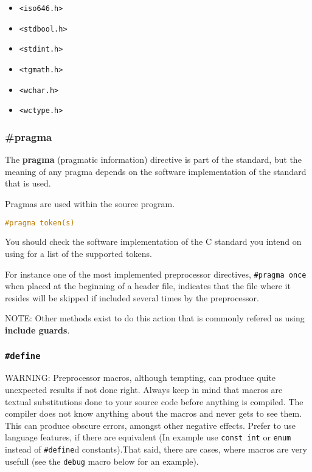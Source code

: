 \begin{itemize}
\setlength{\itemsep}{0cm}
\setlength{\parskip}{0cm}
	\item \texttt{\textless{}iso646.h\textgreater{}}
	\item \texttt{\textless{}stdbool.h\textgreater{}}
	\item \texttt{\textless{}stdint.h\textgreater{}}
\end{itemize}

\begin{itemize}
\setlength{\itemsep}{0cm}
\setlength{\parskip}{0cm}
	\item \texttt{\textless{}tgmath.h\textgreater{}}
	\item \texttt{\textless{}wchar.h\textgreater{}}
	\item \texttt{\textless{}wctype.h\textgreater{}}
\end{itemize}

\subsubsection{\#pragma}
The \textbf{pragma} (pragmatic information) directive is part of the standard,
but the meaning of any pragma depends on the software implementation of the
standard that is used.

Pragmas are used within the source program.
\lstset{basicstyle=\scriptsize, numbers=left, captionpos=b, tabsize=4}
\begin{lstlisting}[caption=Section \thesection listing \arabic{preprocnt},language={C},
breaklines=true,xleftmargin=15pt, label=lst:section\thesection listing\arabic{preprocnt}]
#pragma token(s)
\end{lstlisting}

You should check the software implementation of the C standard you intend on
using for a list of the supported tokens. 

For instance one of the most implemented preprocessor directives,
\texttt{\#pragma once} when placed at the beginning of a header file, indicates
that the file where it resides will be skipped if included several times by the
preprocessor.

NOTE: Other methods exist to do this action that is commonly refered as using
\textbf{include guards}.

\subsubsection{\texttt{\#define}}
WARNING: Preprocessor macros, although tempting, can produce quite unexpected
results if not done right. Always keep in mind that macros are textual
substitutions done to your source code before anything is compiled. The
compiler does not know anything about the macros and never gets to see them.
This can produce obscure errors, amongst other negative effects. Prefer to use
language features, if there are equivalent (In example use \texttt{const int}
or \texttt{enum} instead of \texttt{\#define}d constants).That said, there are
cases, where macros are very usefull (see the \texttt{debug} macro below for an
example).

